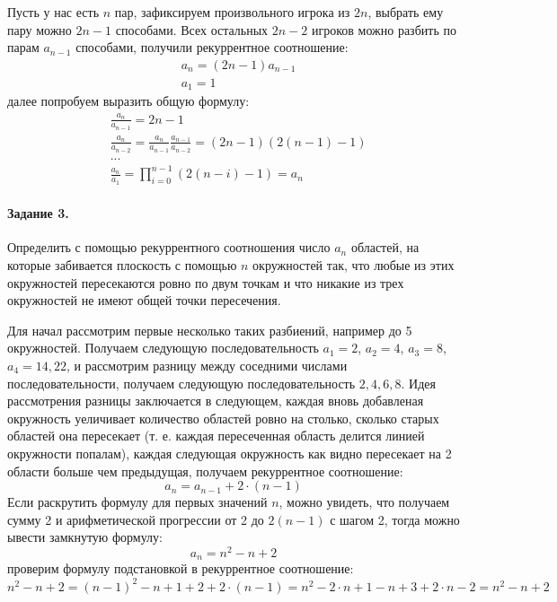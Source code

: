\documentclass[a4paper,12pt]{article}
\begin{document}
\begin{Solution}
Пусть у нас есть $n$ пар, зафиксируем произвольного игрока из $2n$, выбрать ему пару можно $2n-1$ способами. Всех остальных $2n-2$ игроков можно разбить по парам $a_{n-1}$ способами, получили рекуррентное соотношение:
\[
	\begin{split}
		& a_n = \left(2n - 1\right) a_{n-1} \\
		& a_1 = 1
	\end{split}
\]
далее попробуем выразить общую формулу:
\[
	\begin{split}
		& \frac{a_n}{a_{n-1}} = 2n-1 \\
		& \frac{a_n}{a_{n-2}} = \frac{a_n}{a_{n-1}} \frac{a_{n-1}}{a_{n-2}} = \left(2n-1\right) \left(2 \left(n-1\right) - 1\right) \\
		& ... \\
		& \frac{a_n}{a_1} = \prod_{i=0}^{n-1} \left(2\left(n-i\right)-1\right) = a_n
	\end{split}
\]
\end{Solution}

\paragraph{Задание 3.} Определить с помощью рекуррентного соотношения число $a_n$ областей, на которые забивается плоскость с помощью $n$ окружностей так, что любые из этих окружностей пересекаются ровно по двум точкам и что никакие из трех окружностей не имеют общей точки пересечения.

\begin{Solution}
Для начал рассмотрим первые несколько таких разбиений, например до 5 окружностей. Получаем следующую последовательность $a_1 = 2$, $a_2 = 4$, $a_3 = 8$, $a_4 = 14, 22$, и рассмотрим разницу между соседними числами последовательности, получаем следующую последовательность $2, 4, 6, 8$. Идея рассмотрения разницы заключается в следующем, каждая вновь добавленая окружность уеличивает количество областей ровно на столько, сколько старых областей она пересекает (т. е. каждая пересеченная область делится линией окружности попалам), каждая следующая окружность как видно пересекает на 2 области больше чем предыдущая, получаем рекуррентное соотношение:
\[
	a_n = a_{n-1} + 2 \cdot (n-1)
\]
Если раскрутить формулу для первых значений $n$, можно увидеть, что получаем сумму 2 и арифметической прогрессии от 2 до $2\left(n-1\right)$ с шагом 2, тогда можно ывести замкнутую формулу:
\[
	a_n = n^2 - n + 2
\]
проверим формулу подстановкой в рекуррентное соотношение:
\[
	n^2 - n + 2 = {\left(n-1\right)}^2 - n + 1 + 2 + 2 \cdot \left(n - 1\right) = n^2 - 2\cdot n + 1 - n + 3 + 2\cdot n - 2 = n^2 - n + 2
\]
\end{Solution}
\end{document}
